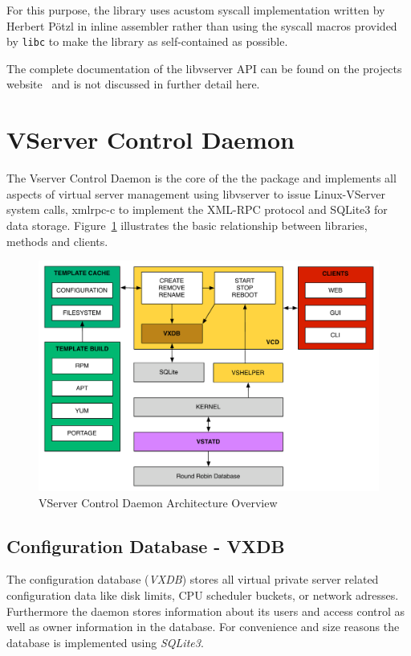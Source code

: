 For this purpose, the library uses acustom  syscall implementation written by
Herbert Pötzl in inline assembler rather than using the syscall macros provided
by \texttt{libc} to make the library as self-contained as possible.

The complete documentation of the libvserver API can be found on the projects
website~\cite{libvserver-doc} and is not discussed in further detail here.


\section{VServer Control Daemon}
\label{sec:intro:vcd:vcd}

The Vserver Control Daemon is the core of the the package and implements all
aspects of virtual server management using libvserver to issue Linux-VServer
system calls, xmlrpc-c to implement the XML-RPC protocol and SQLite3 for
data storage. Figure~\ref{fig:vcd-overview} illustrates the basic relationship
between libraries, methods and clients.

\begin{figure}[hbt]
	\center
	\includegraphics[scale=0.4]{intro/vcd}
	\caption{VServer Control Daemon Architecture Overview}
	\label{fig:vcd-overview}
\end{figure}


\subsection{Configuration Database - VXDB}

The configuration database (\emph{VXDB}) stores all virtual private server
related configuration data like disk limits, CPU scheduler buckets, or network
adresses. Furthermore the daemon stores information about its users and access
control as well as owner information in the database. For convenience and size
reasons the database is implemented using \emph{SQLite3}.

